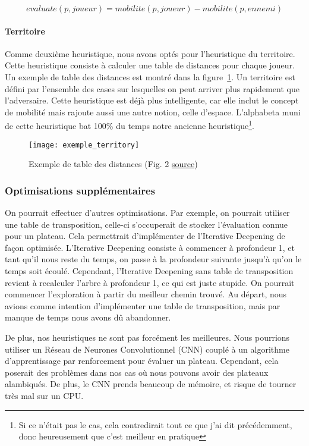 \begin{equation}
	evaluate(p, joueur) = mobilite(p, joueur) - mobilite(p, ennemi)
	\label{eq:mobility-heuristic}
\end{equation}

\paragraph{Territoire}
Comme deuxième heuristique, nous avons optés pour l'heuristique du territoire.
Cette heuristique consiste à calculer une table de distances pour chaque joueur.
Un exemple de table des distances est montré dans la figure~\ref{fig:exemple-territoire}.
Un territoire est défini par l'ensemble des cases sur lesquelles on peut arriver plus rapidement
que l'adversaire. Cette heuristique est déjà plus intelligente, car elle inclut le concept de mobilité mais
rajoute aussi une autre notion, celle d'espace. L'alphabeta muni de cette heuristique bat
100\% du temps notre ancienne heuristique\footnote{Si ce n'était pas le cas, cela contredirait tout ce que j'ai dit précédemment, donc heureusement que c'est meilleur en pratique}.

\begin{figure}[H]
	\centering
	\texttt{[image: exemple\_territory]}
	\caption{Exemple de table des distances (Fig. 2 \href{https://core.ac.uk/download/pdf/81108035.pdf}{source})}
	\label{fig:exemple-territoire}
\end{figure}
\subsubsection{Optimisations supplémentaires}
On pourrait effectuer d'autres optimisations. Par exemple, on pourrait utiliser
une table de transposition, celle-ci s'occuperait de stocker l'évaluation connue pour un plateau.
Cela permettrait d'implémenter de l'Iterative Deepening de façon optimisée. L'Iterative Deepening consiste
à commencer à profondeur 1, et tant qu'il nous reste du temps, on passe à la profondeur suivante jusqu'à qu'on le temps soit écoulé.
Cependant, l'Iterative Deepening sans table de transposition revient à recalculer l'arbre à profondeur 1, ce qui est juste stupide. On pourrait
commencer l'exploration à partir du meilleur chemin trouvé. Au départ, nous avions comme intention
d'implémenter une table de transposition, mais par manque de temps nous avons dû abandonner.

De plus, nos heuristiques ne sont pas forcément les meilleures. Nous pourrions
utiliser un Réseau de Neurones Convolutionnel (CNN) couplé à un algorithme
d'apprentissage par renforcement pour évaluer un plateau. Cependant, cela poserait des problèmes
dans nos cas où nous pouvons avoir des plateaux alambiqués. De plus, le CNN prends
beaucoup de mémoire, et risque de tourner très mal sur un CPU.


